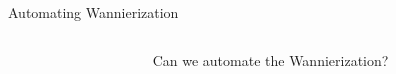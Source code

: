 \documentclass[xcolor=table,aspectratio=169]{beamer}
\numberwithin{equation}{section}
\begin{document}
\begin{frame}{Automating Wannierization}
\begin{columns}
\begin{column}{0.5\textwidth}
\begin{overlayarea}{\columnwidth}{0.6\paperheight}
\begin{center}
         \end{center}
         \end{overlayarea}
      \end{column}
      \begin{column}{0.5\textwidth}
         Can we automate the Wannierization?


\end{column}
\end{columns}
\end{frame}
\end{document}
